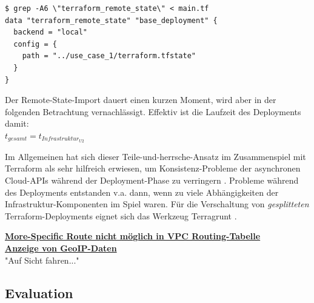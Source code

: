 \begin{lstlisting}[label=tf-remote-state-import,caption=.]
$ grep -A6 \"terraform_remote_state\" < main.tf
data "terraform_remote_state" "base_deployment" {
  backend = "local"
  config = {
    path = "../use_case_1/terraform.tfstate"
  }
}
\end{lstlisting}

Der Remote-State-Import dauert einen kurzen Moment, wird aber in der folgenden Betrachtung vernachlässigt.
Effektiv ist die Laufzeit des Deployments damit:\\
$t_{gesamt} = t_{Infrastruktur_{U2}}$

Im Allgemeinen hat sich dieser \glqq Teile-und-herrsche\grqq{}-Ansatz im Zusammenspiel mit Terraform als sehr hilfreich erwiesen, um Konsistenz-Probleme der asynchronen Cloud-APIs während der Deployment-Phase zu verringern \cite[S.183-184]{Brikman2019}. Probleme während des Deployments entstanden v.a. dann, wenn \glqq zu viele\grqq{} Abhängigkeiten der Infrastruktur-Komponenten im Spiel waren. Für die Verschaltung von \textit{gesplitteten} Terraform-Deployments eignet sich das Werkzeug Terragrunt \cite[S.98]{Brikman2019}.

\textbf{\underline{More-Specific Route nicht möglich in VPC Routing-Tabelle}}\\
\textbf{\underline{Anzeige von GeoIP-Daten}}\\
"Auf Sicht fahren..."


\subsection{Evaluation}

